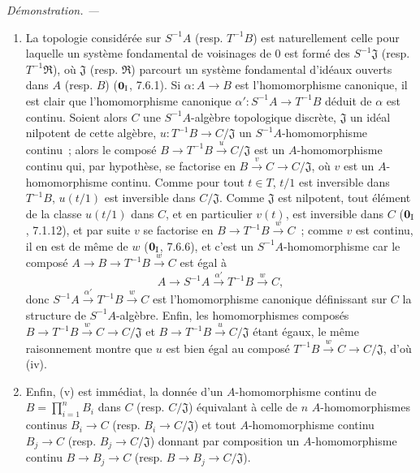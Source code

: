 \documentclass[10pt,oneside]{book}
\newenvironment{proof}{%
  \par\medskip\noindent\textit{Démonstration. ---\ }}{\par}
\begin{document}
\begin{proof}
\begin{enumerate}
  continu d'anneaux $f:B\otimes_A A'\to C$ tel que
  $v=f\circ\rho$ et $w=f\circ\sigma$ ($\mathbf 0_{\rm I}$, 7.7.6)~;
  comme les homomorphismes composés
  $B\xrightarrow{\rho}B\otimes_A A'\xrightarrow{f}C\to C/\mathfrak J$
  et
  $B\xrightarrow{\rho}B\otimes_A A'\xrightarrow{u}C/\mathfrak J$
  (resp.
  $A'\xrightarrow{\sigma}B\otimes_A A'\xrightarrow{f}C\to C/\mathfrak J$
  et
  $A'\xrightarrow{\sigma}B\otimes_A A'\xrightarrow{u}C/\mathfrak J$)
  sont égaux, on a bien la factorisation
  $u:B\otimes_A A'\xrightarrow{f}C\to C/\mathfrak J$, ce qui établit
  (iii).
  \item[(iv)] La topologie considérée sur $S^{-1}A$ (resp. $T^{-1}B$) est
  naturellement celle pour laquelle un système fondamental de voisinages de
  $0$ est formé des $S^{-1}\mathfrak J$ (resp. $T^{-1}\mathfrak R$), où
  $\mathfrak J$ (resp. $\mathfrak R$) parcourt un système fondamental
  d'idéaux ouverts dans $A$ (resp. $B$) ($\mathbf 0_{\rm I}$, 7.6.1). Si
  $\alpha:A\to B$ est l'homomorphisme canonique, il est clair que
  l'homomorphisme canonique $\alpha':S^{-1}A\to T^{-1}B$ déduit de
  $\alpha$ est continu. Soient alors $C$ une $S^{-1}A$-algèbre topologique
  discrète, $\mathfrak J$ un idéal nilpotent de cette algèbre,
  $u:T^{-1}B\to C/\mathfrak J$ un $S^{-1}A$-homomorphisme continu~; alors
  le composé $B\to T^{-1}B\xrightarrow{u}C/\mathfrak J$ est un
  $A$-homomorphisme continu qui, par hypothèse, se factorise en
  $B\xrightarrow{v}C\to C/\mathfrak J$, où $v$ est un $A$-homomorphisme
  continu. Comme pour tout $t\in T$, $t/1$ est inversible dans $T^{-1}B$,
  $u(t/1)$ est inversible dans $C/\mathfrak J$. Comme $\mathfrak J$ est
  nilpotent, tout élément de la classe $u(t/1)$ dans $C$, et en particulier
  $v(t)$, est inversible dans $C$ ($\mathbf 0_{\rm I}$, 7.1.12), et par suite
  $v$ se factorise en $B\to T^{-1}B\xrightarrow{w}C$~; comme $v$ est
  continu, il en est de même de $w$ ($\mathbf 0_{\rm I}$, 7.6.6), et c'est
  un $S^{-1}A$-homomorphisme car le composé
  $A\to B\to T^{-1}B\xrightarrow{w}C$ est égal à
  \[
    A\to S^{-1}A\xrightarrow{\alpha'}T^{-1}B\xrightarrow{w}C,
  \]
  donc $S^{-1}A\xrightarrow{\alpha'}T^{-1}B\xrightarrow{w}C$ est
  l'homomorphisme canonique définissant sur $C$ la structure de
  $S^{-1}A$-algèbre. Enfin, les homomorphismes composés
  $B\to T^{-1}B\xrightarrow{w}C\to C/\mathfrak J$ et
  $B\to T^{-1}B\xrightarrow{u}C/\mathfrak J$ étant égaux, le même
  raisonnement montre que $u$ est bien égal au composé
  $T^{-1}B\xrightarrow{w}C\to C/\mathfrak J$, d'où (iv).
  \item[(v)] Enfin, (v) est immédiat, la donnée d'un $A$-homomorphisme
  continu de $B=\prod_{i=1}^n B_i$ dans $C$ (resp. $C/\mathfrak J$)
  équivalant à celle de $n$ $A$-homomorphismes continus $B_i\to C$
  (resp. $B_i\to C/\mathfrak J$) et tout $A$-homomorphisme continu
  $B_j\to C$ (resp. $B_j\to C/\mathfrak J$) donnant par composition un
  $A$-homomorphisme continu $B\to B_j\to C$
  (resp. $B\to B_j\to C/\mathfrak J$).
\end{enumerate}
\end{proof}
\end{document}
